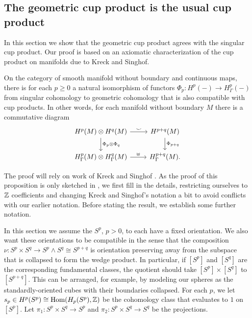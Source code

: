 \subsection{The geometric cup product is the usual cup product}\label{S: usual cup}

In this section we show that the geometric cup product agrees with the singular cup product.
Our proof is based on an axiomatic characterization of the cup product on manifolds due to Kreck and Singhof.

\begin{theorem}\label{T: intersection is cup product}
	On the category of smooth manifold without boundary and continuous maps, there is for each $p\geq 0$ a natural isomorphism of functors $\Phi_p \colon H^p(-) \to H^p_\Gamma(-)$ from singular cohomology to geometric cohomology that is also compatible with cup products.
	In other words, for each manifold without boundary $M$ there is a commutative diagram
	\[
	\begin{tikzcd}
		H^p(M) \otimes H^q(M) \arrow{r}{\smile} \arrow{d}{\Phi_p \otimes \Phi_q} &
		H^{p+q}(M) \arrow{d}{\Phi_{p+q}} \\
		H^p_\Gamma(M) \otimes H^q_\Gamma(M) \arrow{r}{\uplus} & H^{p+q}_\Gamma(M).
	\end{tikzcd}
	\]
\end{theorem}

The proof will rely on work of Kreck and Singhof \cite[Proposition 12]{Krec10b}.
As the proof of this proposition is only sketched in \cite{Krec10b}, we first fill in the details, restricting ourselves to $\mathbb{Z}$ coefficients and changing Kreck and Singhof's notation a bit to avoid conflicts with our earlier notation.
Before stating the result, we establish some further notation.

In this section we assume the $S^p$, $p>0$, to each have a fixed orientation.
We also want these orientations to be compatible in the sense that the composition $\nu \colon S^p \times S^q \to S^p \wedge S^q \cong S^{p+q}$ is orientation preserving away from the subspace that is collapsed to form the wedge product.
In particular, if $[S^p]$ and $[S^q]$ are the corresponding fundamental classes, the quotient should take $[S^p] \times [S^q]$ to $[S^{p+q}]$.
This can be arranged, for example, by modeling our spheres as the standardly-oriented cubes with their boundaries collapsed.
For each $p$, we let $s_p \in H^p(S^p) \cong \textup{Hom}(H_p(S^p), \mathbb{Z})$ be the cohomology class that evaluates to $1$ on $[S^p]$.
Let $\pi_1 \colon S^p \times S^q \to S^p$ and $\pi_2 \colon S^p \times S^q \to S^q$ be the projections.

